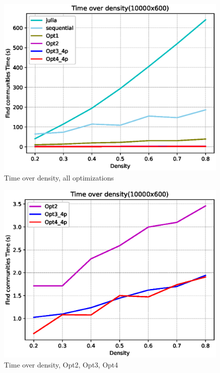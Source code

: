 \documentclass[conference]{IEEEtran}
\begin{document}
\begin{figure}[h!]
    \includegraphics[scale=0.55]{img/timeOverDensityMedium3.eps}
    \vspace*{-8mm}
    \caption{Time over density, all optimizations}
    \label{fig:speedup1}
\end{figure}

\begin{figure}[h!]
    \includegraphics[scale=0.55]{img/timeOverDensityMediumopt234.eps}
    \vspace*{-8mm}
    \caption{Time over density, Opt2, Opt3, Opt4}
    \label{fig:speedup2}
\end{figure}
\end{document}
